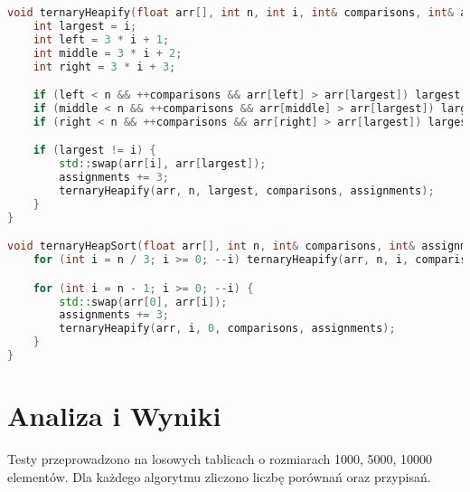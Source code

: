 \documentclass[a4paper,12pt]{article}
\begin{document}
\begin{lstlisting}[language=C++,caption=Heap Sort z kopcem ternarnym]
void ternaryHeapify(float arr[], int n, int i, int& comparisons, int& assignments) {
    int largest = i;
    int left = 3 * i + 1;
    int middle = 3 * i + 2;
    int right = 3 * i + 3;

    if (left < n && ++comparisons && arr[left] > arr[largest]) largest = left;
    if (middle < n && ++comparisons && arr[middle] > arr[largest]) largest = middle;
    if (right < n && ++comparisons && arr[right] > arr[largest]) largest = right;

    if (largest != i) {
        std::swap(arr[i], arr[largest]);
        assignments += 3;
        ternaryHeapify(arr, n, largest, comparisons, assignments);
    }
}

void ternaryHeapSort(float arr[], int n, int& comparisons, int& assignments) {
    for (int i = n / 3; i >= 0; --i) ternaryHeapify(arr, n, i, comparisons, assignments);

    for (int i = n - 1; i >= 0; --i) {
        std::swap(arr[0], arr[i]);
        assignments += 3;
        ternaryHeapify(arr, i, 0, comparisons, assignments);
    }
}
\end{lstlisting}
\newpage
\section{Analiza i Wyniki}
Testy przeprowadzono na losowych tablicach o rozmiarach 1000, 5000, 10000 elementów. Dla każdego algorytmu zliczono liczbę porównań oraz przypisań.
\end{document}
